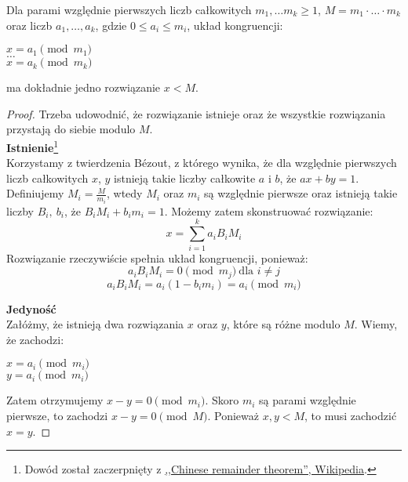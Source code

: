 \begin{theorem}
    Dla parami względnie pierwszych liczb całkowitych \( m_1, \dots m_k \geq 1 \), \( M = m_1 \cdot \ldots \cdot m_k \) oraz liczb \( a_1, \ldots, a_k \), gdzie \( 0 \leq a_i \leq m_i \), układ kongruencji:
    \begin{center}
        \( x = a_1 \pmod{m_1} \) \\
        \( \dots \) \\
        \( x = a_k \pmod{m_k} \)
    \end{center}
    ma dokładnie jedno rozwiązanie \( x < M \).
\end{theorem}
\begin{proof}
    Trzeba udowodnić, że rozwiązanie istnieje oraz że wszystkie rozwiązania przystają do siebie modulo \( M \). \\
    \textbf{Istnienie}\footnote{Dowód został zaczerpnięty z \href{https://en.wikipedia.org/wiki/Chinese_remainder_theorem#Proof}{,,Chinese remainder theorem'', Wikipedia}.} \\
    Korzystamy z twierdzenia B\'ezout, z którego wynika, że dla względnie pierwszych liczb całkowitych \( x \), \( y \) istnieją takie liczby całkowite \( a \) i \( b \), że \( ax + by = 1 \). \\
    Definiujemy \( M_i = \frac{M}{m_i} \), wtedy \( M_i \) oraz \( m_i \) są względnie pierwsze oraz istnieją takie liczby \( B_i, \ b_i \), że \( B_iM_i + b_im_i = 1 \).
    Możemy zatem skonstruować rozwiązanie:
    \[
        x = \sum_{i=1}^{k} a_iB_iM_i
    \]
    Rozwiązanie rzeczywiście spełnia układ kongruencji, ponieważ:
    \[
        a_iB_iM_i = 0 \pmod{m_j} \ \text{dla } i \neq j
    \]
    \[
        a_iB_iM_i = a_i(1 - b_im_i) = a_i \pmod{m_i}
    \]

    \textbf{Jedyność} \\
    Załóżmy, że istnieją dwa rozwiązania \( x \) oraz \( y \), które są różne modulo \( M \). Wiemy, że zachodzi:
    \begin{center}
        \( x = a_i \pmod{m_i} \) \\
        \( y = a_i \pmod{m_i} \)
    \end{center}
    Zatem otrzymujemy \( x-y = 0 \pmod{m_i} \). Skoro \( m_i \) są parami względnie pierwsze, to zachodzi \(  x-y = 0 \pmod{M} \).
    Ponieważ \( x, y < M \), to musi zachodzić \( x = y \).
\end{proof}